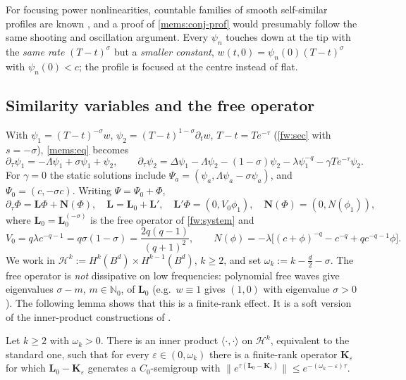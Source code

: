 For focusing power nonlinearities, countable families of smooth self-similar
profiles are known \cite{BizonMaisonWasserman2007}, and a proof of
\cref{mems:conj-prof} would presumably follow the same shooting and oscillation
argument. Every $\psi_n$ touches down at the tip with the \emph{same rate}
$(T-t)^{\sigma}$ but a \emph{smaller constant}, $w(t,0)=\psi_n(0)(T-t)^\sigma$
with $\psi_n(0)<c$; the profile is focused at the centre instead of flat.

\subsection{Similarity variables and the free operator}
\label{mems:sec-lin}
With $\psi_1=(T-t)^{-\sigma}w$, $\psi_2=(T-t)^{1-\sigma}\partial_tw$, $T-t=Te^{-\tau}$
(\cref{fw:sec} with $s=-\sigma$), \eqref{mems:eq} becomes
\begin{equation}\label{mems:system}
\partial_\tau\psi_1=-\Lambda\psi_1+\sigma\psi_1+\psi_2,\qquad
\partial_\tau\psi_2=\Delta\psi_1-\Lambda\psi_2-(1-\sigma)\psi_2-\lambda\psi_1^{-q}-\gamma Te^{-\tau}\psi_2 .
\end{equation}
For $\gamma=0$ the static solutions include $\Psi_a=(\psi_a,\Lambda\psi_a-\sigma\psi_a)$, and
$\Psi_0=(c,-\sigma c)$. Writing $\Psi=\Psi_0+\Phi$,
\begin{equation}\label{mems:pert}
  \partial_\tau\Phi=\mathbf L\Phi+\mathbf N(\Phi),\quad
  \mathbf L=\mathbf L_0+\mathbf L',\quad \mathbf L'\Phi=(0,V_0\phi_1),\quad
  \mathbf N(\Phi)=(0,N(\phi_1)),
\end{equation}
where $\mathbf L_0=\mathbf L_0^{(-\sigma)}$ is the free operator of \eqref{fw:system} and
\begin{equation}\label{mems:V0N}
  V_0=q\lambda c^{-q-1}=q\sigma(1-\sigma)=\frac{2q(q-1)}{(q+1)^2},\qquad
  N(\phi)=-\lambda\big[(c+\phi)^{-q}-c^{-q}+qc^{-q-1}\phi\big].
\end{equation}
We work in $\mathcal H^k:=H^k(B^d)\times H^{k-1}(B^d)$, $k\ge2$, and set
$\omega_k:=k-\frac d2-\sigma$. The free operator is \emph{not} dissipative on
low frequencies: polynomial free waves give eigenvalues $\sigma-m$, $m\in\mathbb
N_0$, of $\mathbf L_0$ (e.g.\ $w\equiv1$ gives $(1,0)$ with eigenvalue $\sigma>0$).
The following lemma shows that this is a finite-rank effect. It is a soft
version of the inner-product constructions of
\cite{Ostermann2024,Glogic2025}.

\begin{lemma}\label{mems:lem-free}
Let $k\ge2$ with $\omega_k>0$. There is an inner product $\langle\cdot,\cdot\rangle$
on $\mathcal H^k$, equivalent to the standard one, such that for every
$\varepsilon\in(0,\omega_k)$ there is a finite-rank operator $\mathbf K_\varepsilon$
for which $\mathbf L_0-\mathbf K_\varepsilon$ generates a $C_0$-semigroup with
$\|e^{\tau(\mathbf L_0-\mathbf K_\varepsilon)}\|\le e^{-(\omega_k-\varepsilon)\tau}$.
\end{lemma}

